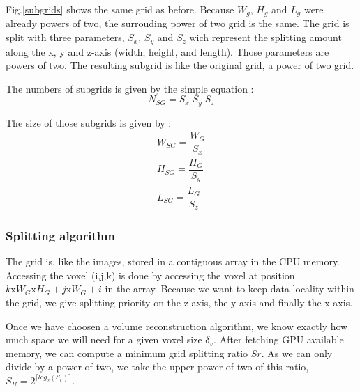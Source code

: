 \documentclass[12pt,journal,compsoc]{IEEEtran}
\begin{document}
Fig.\ref{subgrids} shows the same grid as before. Because $W_g$, $H_g$ and $L_g$ were already powers of two, the surrouding power of two grid is the same. The grid is split with three parameters, $S_x$, $S_y$ and $S_z$ wich represent the splitting amount along the x, y and z-axis (width, height, and length). Those parameters are powers of two. The resulting subgrid is like the original grid, a power of two grid. 
\begin{samepage}
The numbers of subgrids is given by the simple equation :
\begin{equation}
	N_{SG} = S_x\;S_y\;S_z
\end{equation}
\end{samepage}

\begin{samepage}
The size of those subgrids is given by :
\begin{eqnarray}
	W_{SG} = \dfrac{W_G}{S_x}\\
	H_{SG} = \dfrac{H_G}{S_y}\\
	L_{SG} = \dfrac{L_G}{S_z}
\end{eqnarray}
\end{samepage}

\subsubsection{Splitting algorithm}

The grid is, like the images, stored in a contiguous array in the CPU memory. Accessing the voxel (i,j,k) is done by accessing the voxel at position $k\text{x}W_G\text{x}H_G + j\text{x}W_G + i$ in the array.
Because we want to keep data locality within the grid, we give splitting priority on the z-axis, the y-axis and finally the x-axis.

Once we have choosen a volume reconstruction algorithm, we know exactly how much space we will need for a given voxel size $\delta_v$. After fetching GPU available memory, we can compute a minimum grid splitting ratio $Sr$. As we can only divide by a power of two, we take the upper power of two of this ratio,  $S_R = 2^{\lceil log_2(S_r) \rceil}$.
\end{document}
